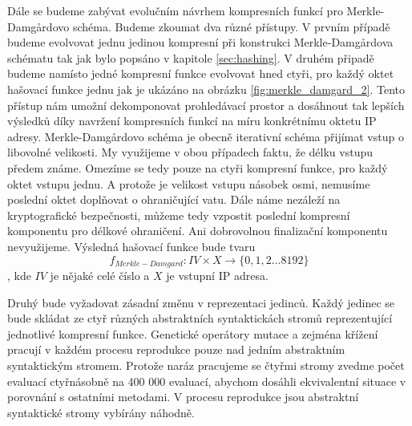 Dále se budeme zabývat evolučním návrhem kompresních funkcí pro Merkle-Damg\r{a}rdovo schéma.
Budeme zkoumat dva různé přístupy. V prvním případě budeme evolvovat jednu jedinou kompresní 
při konstrukci Merkle-Damg\r{a}rdova schématu tak jak bylo popsáno v kapitole \ref{sec:hashing}.
V druhém připadě budeme namísto jedné kompresní funkce evolvovat hned ctyři, pro každý oktet
hašovací funkce jednu jak je ukázáno na obrázku \ref{fig:merkle_damgard_2}. Tento přístup nám
umožní dekomponovat prohledávací prostor a dosáhnout tak lepších výsledků díky navržení
kompresních funkcí na míru konkrétnímu oktetu IP adresy. Merkle-Damg\r{a}rdovo schéma je obecně
iterativní schéma přijímat vstup o libovolné velikosti. My využijeme v obou případech faktu, že délku
vstupu předem známe. Omezíme se tedy pouze na ctyři kompresní funkce, pro každý oktet vstupu jednu.
A protože je velikost vstupu násobek osmi, nemusíme poslední oktet doplňovat o ohraničující vatu. Dále
náme nezáleží na kryptografické bezpečnosti, můžeme tedy vzpostit poslední kompresní komponentu
pro délkové ohraničení. Ani dobrovolnou finalizační komponentu nevyužijeme. Výsledná hašovací funkce
bude tvaru
$$f_{Merkle-Damgard} : IV \times X \to \{0,1,2 \ldots 8192\}$$,
kde $IV$ je nějaké celé číslo a $X$ je vstupní IP adresa.

Druhý bude vyžadovat zásadní změnu v reprezentaci jedinců. Každý jedinec se bude skládat ze ctyř 
různých abstraktních syntaktickách stromů reprezentující jednotlivé kompresní funkce. Genetické operátory
mutace a zejména křížení pracují v každém procesu reprodukce pouze nad jedním abstraktním
syntaktickým stromem. Protože naráz pracujeme se čtyřmi stromy zvedme počet evaluací ctyřnásobně na
400 000 evaluací, abychom dosáhli ekvivalentní situace v porovnání s ostatními metodami. V procesu
reprodukce jsou abstraktní syntaktické stromy vybírány náhodně. 

